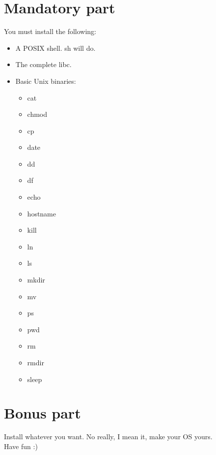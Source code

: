 \documentclass{42-en}
\begin{document}
\chapter{Mandatory part}
    You must install the following:
    \begin{itemize}\itemsep1pt
        \item A POSIX shell. sh will do.
        \item The complete libc.
        \item Basic Unix binaries:
        \begin{itemize}\itemsep1pt
            \item cat
            \item chmod
            \item cp
            \item date
            \item dd
            \item df
            \item echo
            \item hostname
            \item kill
            \item ln
            \item ls
            \item mkdir
            \item mv
            \item ps
            \item pwd
            \item rm
            \item rmdir
            \item sleep
        \end{itemize}
    \end{itemize}


\chapter{Bonus part}
Install whatever you want. No really, I mean it, make your OS yours.\\
Have fun :)
\end{document}
